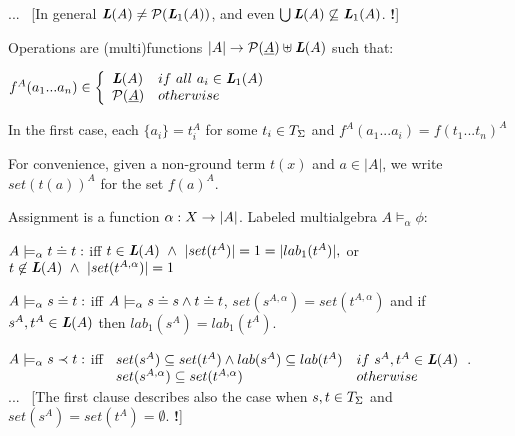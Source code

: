 \documentclass[10pt]{article}
\newcommand{\comt}[1]{... \ \hfill{\small{[#1 {\bf !}]}}}
\begin{document}
\begin{Definition}
\comt{In general $\mbox{\bf{\em L}}(A) \not= {\mathcal{P}}(\mbox{\bf{\em L}}_1(A))$, and even $\bigcup\mbox{\bf{\em L}}(A)\not\subseteq\mbox{\bf{\em L}}_1(A)$.} 
%

Operations are  (multi)functions
$|A|\rightarrow {\mathcal{P}}(\underline {A})\uplus\mbox{\bf{\em L}}(A)$ such that:
\begin{ite}
\item $f^A(a_1...a_n) \in\left\{\begin{array}{ll}
   \mbox{\bf{\em L}}(A) & if\ all\ a_i\in\mbox{\bf{\em L}}_1(A)\\
   {\mathcal{P}}(\underline {A}) & otherwise \end{array}\right.$
\item In the first case, each $\{a_i\}=t^A_i$ for some $t_i\in T_{\Sigma}$ and
$f^A(a_1...a_i) = f(t_1...t_n)^A$
\end{ite}
For convenience, given a non-ground
term $t(x)$ and $a\in |A|$, we write $set(t(a))^A$ for 
the set $f(a)^A$.
\end{Definition}

\begin{Definition}\label{de:sat}
Assignment is a function $\alpha:X\rightarrow|A|$.
Labeled multialgebra $A\models_\alpha \phi$:
\begin{ite}
\item $A\models_\alpha t\mathrel{\dot{=} } t:$ iff $ t\in\mbox{\bf{\em L}}(A)\ \land\
|set(t^A)|=1=|lab_1(t^A)|,$ or $t\not\in \G A\ \land\ |set(t^{A,\alpha})|=1$

\item $A\models_\alpha s\mathrel{\dot{=} } t:$ iff $A\models_\alpha s\mathrel{\dot{=} } s\land t\mathrel{\dot{=} }
t$, $set(s^{A,\alpha})=set(t^{A,\alpha})$ and if $s^A,t^A\in\mbox{\bf{\em L}}(A)$ then $lab_1(s^A)=lab_1(t^A)$.
\item $A\models_\alpha s\prec t:$ iff $\begin{array}[t]{ll}
set(s^A)\subseteq set(t^A)\land lab(s^A)\subseteq lab(t^A) & if\
s^A,t^A\in\mbox{\bf{\em L}}(A)\\
set(s^{A,\alpha})\subseteq set(t^{A,\alpha}) & otherwise \end{array}$. \\
\comt{The first clause describes also the case when $s,t\in T_{\Sigma}$ and $set(s^A)=set(t^A)=\emptyset$.}
\end{ite}
\end{Definition}
\end{document}
